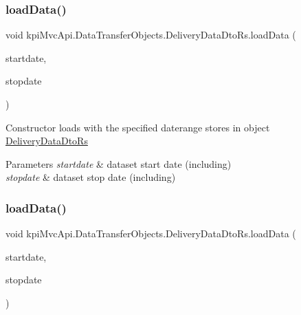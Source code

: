 \subsubsection{\texorpdfstring{load\+Data()}{loadData()}\hspace{0.1cm}{\footnotesize\ttfamily [5/6]}}
{\footnotesize\ttfamily void kpi\+Mvc\+Api.\+Data\+Transfer\+Objects.\+Delivery\+Data\+Dto\+Rs.\+load\+Data (\begin{DoxyParamCaption}\item[{Date\+Time}]{startdate,  }\item[{Date\+Time}]{stopdate }\end{DoxyParamCaption})\hspace{0.3cm}{\ttfamily [inline]}}



Constructor loads with the specified daterange stores in object {\ttfamily \hyperlink{classkpi_mvc_api_1_1_data_transfer_objects_1_1_delivery_data_dto_rs}{Delivery\+Data\+Dto\+Rs}} 


\begin{DoxyParams}{Parameters}
{\em startdate} & dataset start date (including)\\
\hline
{\em stopdate} & dataset stop date (including)\\
\hline
\end{DoxyParams}
\mbox{\label{classkpi_mvc_api_1_1_data_transfer_objects_1_1_delivery_data_dto_rs_aab956a92693af48a6da78eab193b9ca7}} 
\subsubsection{\texorpdfstring{load\+Data()}{loadData()}\hspace{0.1cm}{\footnotesize\ttfamily [6/6]}}
{\footnotesize\ttfamily void kpi\+Mvc\+Api.\+Data\+Transfer\+Objects.\+Delivery\+Data\+Dto\+Rs.\+load\+Data (\begin{DoxyParamCaption}\item[{Date\+Time}]{startdate,  }\item[{Date\+Time}]{stopdate }\end{DoxyParamCaption})\hspace{0.3cm}{\ttfamily [inline]}}



